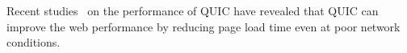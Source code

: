 
Recent studies~\cite{Megyesi2016, Carlucci,Lychev2015,Biswal2016} on the performance of \ac{QUIC} have revealed that \ac{QUIC} can improve the web performance by reducing page load time even at poor network conditions.
%
